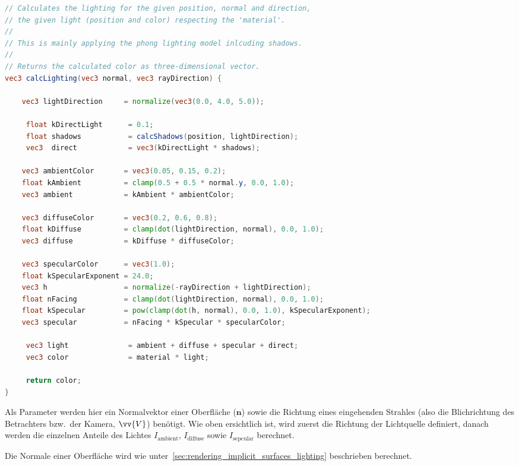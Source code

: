 \begin{lstlisting}[language=GLSL,caption={Umsetzung des
        Phong-Beleuchtungsmodelles in
        GLSL.},label={alg:glsl_lighting},captionpos=b,emph={calcLighting}]
// Calculates the lighting for the given position, normal and direction,
// the given light (position and color) respecting the 'material'.
//
// This is mainly applying the phong lighting model inlcuding shadows.
//
// Returns the calculated color as three-dimensional vector.
vec3 calcLighting(vec3 normal, vec3 rayDirection) {

    vec3 lightDirection     = normalize(vec3(0.0, 4.0, 5.0));

     float kDirectLight      = 0.1;
     float shadows           = calcShadows(position, lightDirection);
     vec3  direct            = vec3(kDirectLight * shadows);

    vec3 ambientColor       = vec3(0.05, 0.15, 0.2);
    float kAmbient          = clamp(0.5 + 0.5 * normal.y, 0.0, 1.0);
    vec3 ambient            = kAmbient * ambientColor;

    vec3 diffuseColor       = vec3(0.2, 0.6, 0.8);
    float kDiffuse          = clamp(dot(lightDirection, normal), 0.0, 1.0);
    vec3 diffuse            = kDiffuse * diffuseColor;

    vec3 specularColor      = vec3(1.0);
    float kSpecularExponent = 24.0;
    vec3 h                  = normalize(-rayDirection + lightDirection);
    float nFacing           = clamp(dot(lightDirection, normal), 0.0, 1.0);
    float kSpecular         = pow(clamp(dot(h, normal), 0.0, 1.0), kSpecularExponent);
    vec3 specular           = nFacing * kSpecular * specularColor;

     vec3 light              = ambient + diffuse + specular + direct;
     vec3 color              = material * light;
 
     return color;
}
\end{lstlisting}

Als Parameter werden hier ein Normalvektor einer Oberfläche ($\bm{n}$)
sowie die Richtung eines eingehenden Strahles (also die Blichrichtung
des Betrachters bzw.\ der Kamera, $\vv{V}$) benötigt.
Wie oben ersichtlich ist, wird zuerst die Richtung der Lichtquelle definiert,
danach werden die einzelnen Anteile des Lichtes $I_{\text{ambient}}$,
$I_{\text{diffuse}}$ sowie $I_{\text{sepcular}}$ berechnet.

Die Normale einer Oberfläche wird wie
unter~\autoref{sec:rendering_implicit_surfaces_lighting} beschrieben
berechnet.

